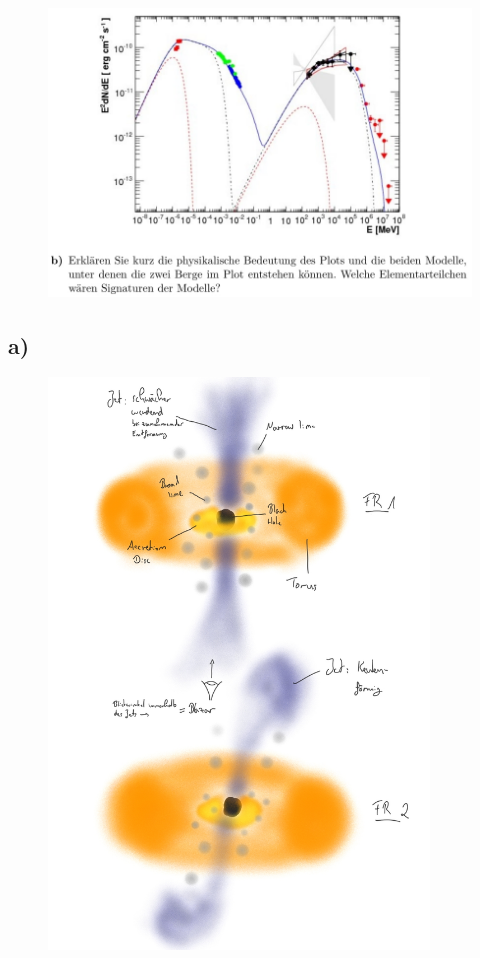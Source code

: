 \begin{figure}[H]
    \centering
    \includegraphics[width=\textwidth]{images/Aufgabe30b.jpg}
\end{figure}

\subsection{a)}

\newpage
\begin{figure}[H]
    \centering
    \includegraphics[width=0.9\textwidth]{images/30a.jpg}
\end{figure}

